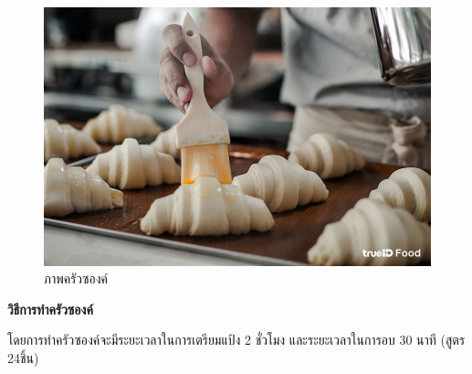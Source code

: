 \documentclass{report}
\begin{document}
\begin{figure}[h!]
	\centering
	\includegraphics[scale=0.25]{OIP.jpg}
	\caption{ภาพครัวซองค์ \cite{POPO}}
	\label{fig:graph1}
\end{figure}

\textbf{วิธีการทําครัวซองค์}  \par โดยการทำครัวซองค์จะมีระยะเวลาในการเตรียมแป้ง 2 ชั่วโมง และระยะเวลาในการอบ 30 นาที (สูตร 24ชิ้น)\par
\end{document}
